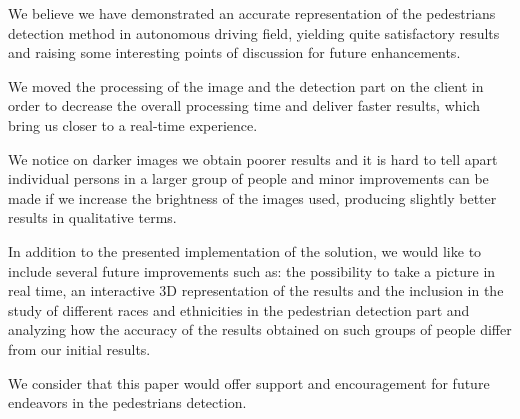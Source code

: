 \documentclass[runningheads,a4paper,11pt]{report}
\begin{document}
We believe we have demonstrated an accurate representation of the pedestrians detection method in autonomous driving field, yielding quite satisfactory results and raising some interesting points of discussion for future enhancements.

We moved the processing of the image and the detection part on the client in order to decrease the overall processing time and deliver faster results, which bring us closer to a real-time experience.

We notice on darker images we obtain poorer results and it is hard to tell apart individual persons in a larger group of people and minor improvements can be made if we increase the brightness of the images used, producing slightly better results in qualitative terms.

In addition to the presented implementation of the solution, we would like to include several future improvements such as: the possibility to take a picture in real time, an interactive 3D representation of the results and the
inclusion in the study of different races and ethnicities in the pedestrian detection part and analyzing how the accuracy of the results obtained on such groups of people differ from our initial results.

We consider that this paper would offer support and encouragement for future endeavors in the pedestrians detection.
\end{document}
